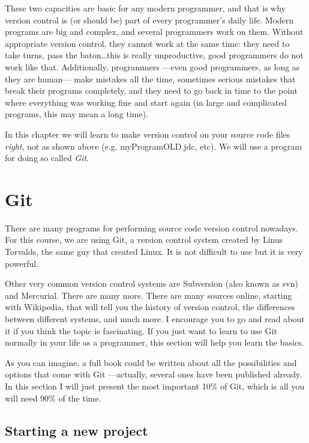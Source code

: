 These two capacities are basic for any modern programmer, and that is
why version control is (or should be) part of every programmer's daily
life. Modern programs are big and complex, and several programmers
work on them. Without appropriate version control, they cannot work at
the same time: they need to take turns, pass the baton\ldots this is
really unproductive, good programmers do not work like
that. Additionally, programmers ---even good programmers, as long as
they are human--- make mistakes all the time, sometimes serious
mistakes that break their programs completely, and they need to go
back in time to the point where everything was working fine and start
again (in large and complicated programs, this may mean a long time).

In this chapter we will learn to make version control on your source
code files \emph{right}, not as shown above (e.g. myProgramOLD.jdc,
etc). We will use a program for doing so called \emph{Git}.

\section{Git}
\label{sec:git}

There are many programs for performing source code version control
nowadays. For this course, we are using Git, a version control system
created by Linus Torvalds, the same guy that created Linux. It is not
difficult to use but it is very powerful. 

Other very common version control systems are Subversion (also known
as svn) and Mercurial. There are many more. There are many sources
online, starting with Wikipedia, that will tell you the history of
version control, the differences between different systems, and much
more. I encourage you to go and read about it if you think the topic
is fascinating. If you just want to learn to use Git normally in
your life as a programmer, this section will help you learn the
basics. 

As you can imagine, a full book could be written about all the
possibilities and options that come with Git ---actually, several ones
have been published already. In this section I will just present the
most important 10\% of Git, which is all 
you will need 90\% of the time.  

\subsection{Starting a new project}
\label{sec:starting-new-project}

